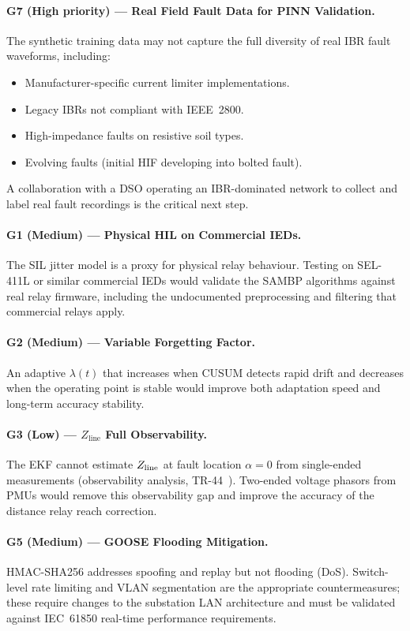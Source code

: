 \paragraph{G7 (High priority) — Real Field Fault Data for PINN Validation.}
The synthetic training data may not capture the full diversity of
real IBR fault waveforms, including:
\begin{itemize}
\item Manufacturer-specific current limiter implementations.
\item Legacy IBRs not compliant with IEEE~2800.
\item High-impedance faults on resistive soil types.
\item Evolving faults (initial HIF developing into bolted fault).
\end{itemize}
A collaboration with a DSO operating an IBR-dominated network to collect
and label real fault recordings is the critical next step.

\paragraph{G1 (Medium) — Physical HIL on Commercial IEDs.}
The SIL jitter model is a proxy for physical relay behaviour. Testing
on SEL-411L or similar commercial IEDs would validate the SAMBP
algorithms against real relay firmware, including the undocumented
preprocessing and filtering that commercial relays apply.

\paragraph{G2 (Medium) — Variable Forgetting Factor.}
An adaptive $\lambda(t)$ that increases when CUSUM detects rapid drift
and decreases when the operating point is stable would improve both
adaptation speed and long-term accuracy stability.

\paragraph{G3 (Low) — \texorpdfstring{$Z_\mathrm{line}$}{Z\_line} Full Observability.}
The EKF cannot estimate $Z_{\mathrm{line}}$ at fault location $\alpha = 0$ from
single-ended measurements (observability analysis, TR-44~\cite{SAMBP_TR44}).
Two-ended voltage phasors from PMUs would remove this observability gap
and improve the accuracy of the distance relay reach correction.

\paragraph{G5 (Medium) — GOOSE Flooding Mitigation.}
HMAC-SHA256 addresses spoofing and replay but not flooding (DoS).
Switch-level rate limiting and VLAN segmentation are the appropriate
countermeasures; these require changes to the substation LAN architecture
and must be validated against IEC~61850 real-time performance requirements.

